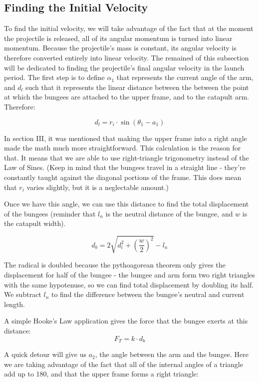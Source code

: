 \documentclass[10pt]{article}
\begin{document}
\begin{flushleft}
    \subsection{Finding the Initial Velocity}
    To find the initial velocity, we will take advantage of the fact that at the moment the projectile is released, all of its angular momentum is turned into linear momentum.
    Because the projectile's mass is constant, its angular velocity is therefore converted entirely into linear velocity.
    The remained of this subsection will be dedicated to finding the projectile's final angular velocity in the launch period.
    The first step is to define $\alpha_1$ that represents the current angle of the arm, and $d_l$ such that it represents the linear distance between the between the point at which the bungees are attached to the upper frame, and to the catapult arm.
    Therefore:
    
    $$d_l = r_i \cdot \sin(\theta_1 - a_1) $$
    
    In section III, it was mentioned that making the upper frame into a right angle made the math much more straightforward. This calculation is the reason for that. It means that we are able to use right-triangle trigonometry instead of the Law of Sines.
    (Keep in mind that the bungees travel in a straight line - they're constantly taught against the diagonal portions of the frame. This does mean that $r_i$ varies slightly, but it is a neglectable amount.)

    \par
    Once we have this angle, we can use this distance to find the total displacement of the bungees (reminder that $l_n$ is the neutral distance of the bungee, and $w$ is the catapult width).
    
    $$d_b = 2\sqrt{d_l^2 + \left( \frac{w}{2} \right)^2 } - l_n $$
    
    The radical is doubled because the pythoagorean theorem only gives the displacement for half of the bungee - the bungee and arm form two right triangles with the same hypotenuse, so we can find total displacement by doubling its half.
    We subtract $l_n$ to find the difference between the bungee's neutral and current length.

    \par
    A simple Hooke's Law application gives the force that the bungee exerts at this distance:
    $$ F_T = k \cdot d_b $$

    A quick detour will give us $a_2$, the angle between the arm and the bungee. Here we are taking advantage of the fact that all of the internal angles of a triangle add up to 180\textdegree, and that the upper frame forms a right triangle:
    

\end{flushleft}
\end{document}
